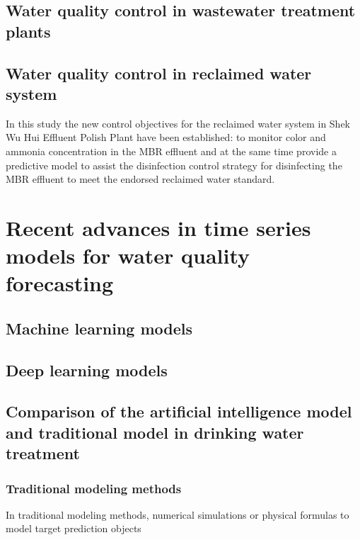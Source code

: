 \subsection{Water quality control in wastewater treatment plants}
\subsection{Water quality control in reclaimed water system}

In this study the new control objectives for the reclaimed water system in 
Shek Wu Hui Effluent Polish Plant have been established: to monitor color 
and ammonia concentration in the MBR effluent and at the same time provide 
a predictive model to assist the disinfection control strategy for disinfecting 
the MBR effluent to meet the endorsed reclaimed water standard.

\section{Recent advances in time series models for water quality forecasting}
\subsection{Machine learning models}

\subsection{Deep learning models}
\subsection{Comparison of the artificial intelligence model and traditional model in drinking water treatment}
\subsubsection{Traditional modeling methods}
In traditional modeling methods, numerical simulations or physical formulas to model target prediction objects
